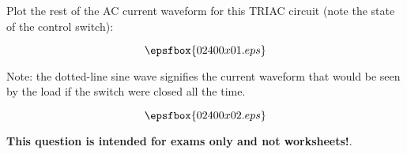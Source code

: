 

Plot the rest of the AC current waveform for this TRIAC circuit (note the state of the control switch):

$$\epsfbox{02400x01.eps}$$

Note: the dotted-line sine wave signifies the current waveform that would be seen by the load if the switch were closed all the time.







$$\epsfbox{02400x02.eps}$$







{\bf This question is intended for exams only and not worksheets!}.




